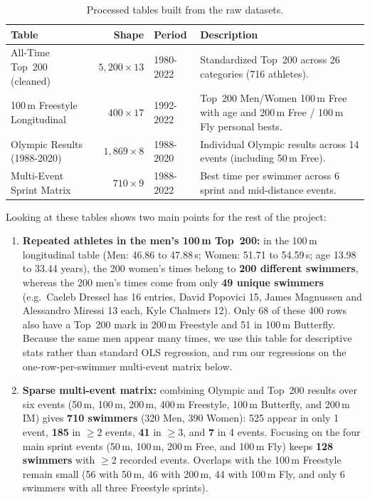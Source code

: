\documentclass[11pt, a4paper]{article}
\begin{document}
\begin{table}[H]
    \centering
    \small
    \renewcommand{\arraystretch}{1.2}
    \begin{tabularx}{\textwidth}{@{}l r l >{\raggedright\arraybackslash}X@{}}
        \toprule
        \textbf{Table} & \textbf{Shape} & \textbf{Period} & \textbf{Description} \\
        \midrule
        All-Time Top~200 (cleaned) & $5{,}200 \times 13$ & 1980-2022 & Standardized Top~200 across 26 categories (716 athletes). \\
        100\,m Freestyle Longitudinal & $400 \times 17$ & 1992-2022 & Top~200 Men/Women 100\,m Free with age and 200\,m Free / 100\,m Fly personal bests. \\
        Olympic Results (1988-2020) & $1{,}869 \times 8$ & 1988-2020 & Individual Olympic results across 14 events (including 50\,m Free). \\
        Multi-Event Sprint Matrix & $710 \times 9$ & 1988-2022 & Best time per swimmer across 6 sprint and mid-distance events. \\
        \bottomrule
    \end{tabularx}
    \caption{Processed tables built from the raw datasets.}
    \label{tab:phase1_datasets}
\end{table}

\noindent Looking at these tables shows two main points for the rest of the project:
\begin{enumerate}
    \item \textbf{Repeated athletes in the men's 100\,m Top~200:} in the 100\,m longitudinal table (Men: 46.86 to 47.88\,s; Women: 51.71 to 54.59\,s; age 13.98 to 33.44 years), the 200 women's times belong to \textbf{200 different swimmers}, whereas the 200 men's times come from only \textbf{49 unique swimmers} (e.g.\ Caeleb Dressel has 16 entries, David Popovici 15, James Magnussen and Alessandro Miressi 13 each, Kyle Chalmers 12). Only 68 of these 400 rows also have a Top~200 mark in 200\,m Freestyle and 51 in 100\,m Butterfly. Because the same men appear many times, we use this table for descriptive stats rather than standard OLS regression, and run our regressions on the one-row-per-swimmer multi-event matrix below.

    \item \textbf{Sparse multi-event matrix:} combining Olympic and Top~200 results over six events (50\,m, 100\,m, 200\,m, 400\,m Freestyle, 100\,m Butterfly, and 200\,m IM) gives \textbf{710 swimmers} (320 Men, 390 Women): 525 appear in only 1 event, \textbf{185} in $\ge 2$ events, \textbf{41} in $\ge 3$, and \textbf{7} in 4 events. Focusing on the four main sprint events (50\,m, 100\,m, 200\,m Free, and 100\,m Fly) keeps \textbf{128 swimmers} with $\ge 2$ recorded events. Overlaps with the 100\,m Freestyle remain small (56 with 50\,m, 46 with 200\,m, 44 with 100\,m Fly, and only 6 swimmers with all three Freestyle sprints).
\end{enumerate}
\end{document}
